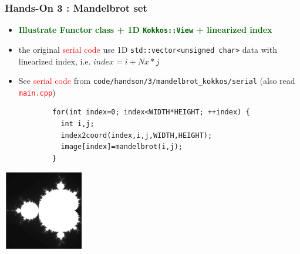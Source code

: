 \begin{frame}[fragile=singleslide]
  \frametitle{Hands-On 3 : Mandelbrot set}

  \hypertarget{handson3}{}
  \begin{itemize}
  \item \textcolor{darkgreen}{\textbf{Illustrate Functor class + 1D \texttt{Kokkos::View} + linearized index}}
  \item the original \textcolor{red}{serial code} use 1D \texttt{std::vector<unsigned char>} data with linearized index, i.e. $index = i + Nx * j$
  \item See \textcolor{red}{serial code} from \texttt{code/handson/3/mandelbrot\_kokkos/serial} (also read \textcolor{red}{\texttt{main.cpp}})
    {\small
      \begin{verbatim}
        for(int index=0; index<WIDTH*HEIGHT; ++index) {
          int i,j;
          index2coord(index,i,j,WIDTH,HEIGHT);
          image[index]=mandelbrot(i,j);
        }
      \end{verbatim}
    }
  \end{itemize}

  \begin{center}
    \includegraphics[width=3.5cm]{images/mandelbrot}
  \end{center}
  
\end{frame}


